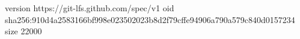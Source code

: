 version https://git-lfs.github.com/spec/v1
oid sha256:910d4a2583166bf998e023502023b8d2f79cffe94906a790a579c840d0157234
size 22000

